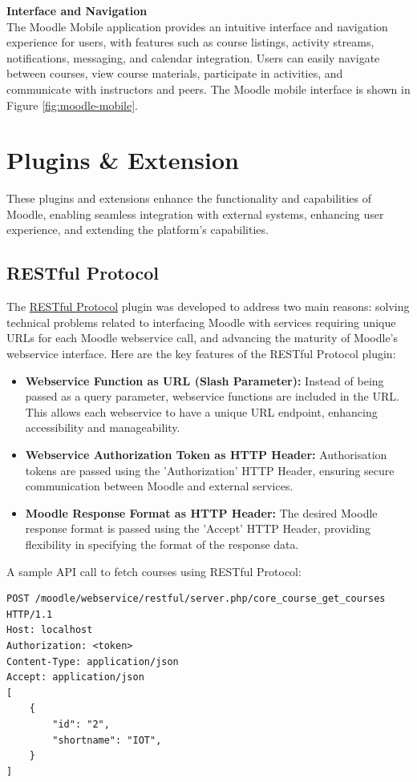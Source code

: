\textbf{Interface and Navigation}\\
The Moodle Mobile application provides an intuitive interface and navigation experience for users, with features such as course listings, activity streams, notifications, messaging, and calendar integration. Users can easily navigate between courses, view course materials, participate in activities, and communicate with instructors and peers. The Moodle mobile interface is shown in Figure \ref{fig:moodle-mobile}.

\section{Plugins \& Extension}
These plugins and extensions enhance the functionality and capabilities of Moodle, enabling seamless integration with external systems, enhancing user experience, and extending the platform's capabilities.

\subsection{RESTful Protocol}

The \href{https://github.com/catalyst/moodle-webservice_restful}{RESTful Protocol} plugin was developed to address two main reasons: solving technical problems related to interfacing Moodle with services requiring unique URLs for each Moodle webservice call, and advancing the maturity of Moodle's webservice interface. Here are the key features of the RESTful Protocol plugin:

\begin{itemize}
    \item \textbf{Webservice Function as URL (Slash Parameter):} Instead of being passed as a query parameter, webservice functions are included in the URL. This allows each webservice to have a unique URL endpoint, enhancing accessibility and manageability.
    \item \textbf{Webservice Authorization Token as HTTP Header:} Authorisation tokens are passed using the 'Authorization' HTTP Header, ensuring secure communication between Moodle and external services.
    \item \textbf{Moodle Response Format as HTTP Header:} The desired Moodle response format is passed using the 'Accept' HTTP Header, providing flexibility in specifying the format of the response data.
\end{itemize}


A sample API call to fetch courses using RESTful Protocol:
\begin{verbatim}
POST /moodle/webservice/restful/server.php/core_course_get_courses HTTP/1.1
Host: localhost
Authorization: <token>
Content-Type: application/json
Accept: application/json
[
    { 
        "id": "2",
        "shortname": "IOT",
    }
]
\end{verbatim}

